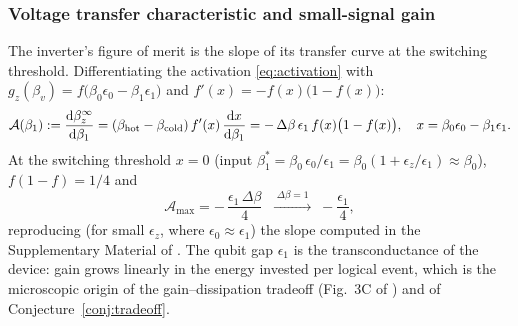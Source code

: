 \documentclass[11pt,a4paper]{article}
\theoremstyle{definition}
\theoremstyle{remark}
\begin{document}
\subsubsection{Voltage transfer characteristic and small-signal gain}
The inverter's figure of merit is the slope of its transfer curve at
the switching threshold. Differentiating the activation
\eqref{eq:activation} with $g_z(\beta_v) =
f\big(\beta_0\epsilon_0-\beta_1\epsilon_1\big)$ and
$f'(x) = -f(x)\big(1-f(x)\big)$:
\begin{equation}
\mathcal{A}(\beta_1)
:= \dv{\beta_z^\infty}{\beta_1}
= (\beta_{\mathrm{hot}}-\beta_{\mathrm{cold}})\,
f'(x)\,\dv{x}{\beta_1}
= -\,\Delta\beta\,\epsilon_1\, f(x)\big(1-f(x)\big) ,
\quad x = \beta_0\epsilon_0-\beta_1\epsilon_1 .
\label{eq:gain}
\end{equation}
At the switching threshold $x=0$ (input
$\beta_1^{\ast} = \beta_0\,\epsilon_0/\epsilon_1
= \beta_0(1+\epsilon_z/\epsilon_1)\approx\beta_0$),
$f(1-f) = 1/4$ and
\begin{equation}
\mathcal{A}_{\max}
= -\,\frac{\epsilon_1\,\Delta\beta}{4}
\;\;\xrightarrow{\;\Delta\beta=1\;}\; -\frac{\epsilon_1}{4},
\label{eq:gain-max}
\end{equation}
reproducing (for small $\epsilon_z$, where
$\epsilon_0\approx\epsilon_1$) the slope computed in the Supplementary
Material of \cite{LipkaBartosik2024}. The qubit gap $\epsilon_1$ is
the transconductance of the device: gain grows linearly in the energy
invested per logical event, which is the microscopic origin of the
gain--dissipation tradeoff (Fig.~3C of \cite{LipkaBartosik2024}) and
of Conjecture~\ref{conj:tradeoff}.
 
\end{document}
